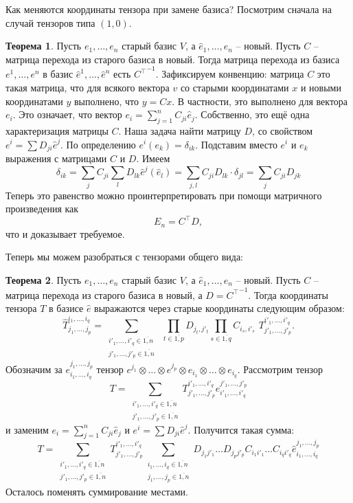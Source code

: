 \documentclass[10pt,a4paper,oneside]{book}
\theoremstyle{definition}
\newtheorem{thm}{{\color{red!40!black} Теорема}}
\newcommand{\ovl}{\overline}
\def\thrm{\begin{thm}}
\def\ethrm{\end{thm}}
\begin{document}
Как меняются координаты тензора при замене базиса? Посмотрим сначала на случай тензоров типа $(1,0)$.

\thrm Пусть $e_1,\dots,e_n$ старый базис $V$, а $\hat{e}_1,\dots,\hat{e}_n$ -- новый. Пусть $C$ -- матрица перехода из старого базиса в новый. Тогда матрица перехода из базиса $e^1,\dots,e^n$ в базис $\hat{e}^1,\dots,\hat{e}^n$ есть ${C^{\top}}^{-1}$.
\proof Зафиксируем конвенцию: матрица $C$ это такая матрица, что для всякого вектора $v$ со старыми координатами $x$ и новыми координатами $y$ выполнено, что $y=Cx$. В частности, это выполнено для вектора $e_i$. Это означает, что вектор $e_i=\sum_{j=1}^nC_{ji}\hat{e}_j$. Собственно, это ещё одна характеризация матрицы $C$. Наша задача найти матрицу $D$, со свойством $e^i=\sum D_{ji}\hat{e}^j$. По определению $e^i(e_k)=\delta_{ik}$. Подставим вместо $e^i$ и $e_k$ выражения с матрицами $C$ и $D$. Имеем
$$\delta_{ik}=\sum_{j}C_{ji} \sum_{l}D_{lk}\hat{e}^j(\hat{e}_l)=\sum_{j,l}C_{ji}D_{lk}\cdot\delta_{jl}=\sum_{j}C_{ji}D_{jk}$$
Теперь это равенство можно проинтерпретировать при помощи матричного произведения как 
$$E_n=C^{\top}D,$$
что и доказывает требуемое.
\endproof
\ethrm

Теперь мы можем разобраться с тензорами общего вида:

\thrm Пусть $e_1,\dots,e_n$ старый базис $V$, а $\hat{e}_1,\dots,\hat{e}_n$ -- новый. Пусть $C$ -- матрица перехода из старого базиса в новый, а $D={C^{\top}}^{-1}$. Тогда координаты тензора $T$ в базисе $\hat{e}$ выражаются через старые координаты следующим образом:
$$\hat{T}_{j_1,\dots,j_p}^{i_1,\dots,i_q}=\sum_{\substack{i'_1,\dots,i'_q \in \ovl{1,n}\\ j'_1,\dots,j'_p \in \ovl{1,n}}} \,\,
\prod_{t\in \ovl{1,p}} D_{j_t,j'_t} \prod_{s\in \ovl{1,q}} C_{i_s,i'_s}  \,\,T_{j'_1,\dots,j'_p}^{i'_1,\dots,i'_q}.$$
\proof Обозначим за $e^{j_1,\dots,j_p}_{i_1,\dots,i_q}$ тензор $e^{j_1}\otimes \dots \otimes e^{j_p} \otimes e_{i_1}\otimes \dots \otimes e_{i_q}$. Рассмотрим тензор
$$ T= \sum_{\substack{i'_1,\dots,i'_q \in \ovl{1,n}\\ j'_1,\dots,j'_p \in \ovl{1,n}}} T_{j'_1,\dots,j'_p}^{i'_1,\dots,i'_q} e^{j'_1,\dots,j'_p}_{i'_1,\dots,i'_q}$$ 
и заменим $e_i=\sum_{j=1}^nC_{ji}\hat{e}_j$ и $e^i=\sum D_{ji}\hat{e}^j$. Получится такая сумма:
$$ T= \sum_{\substack{i'_1,\dots,i'_q \in \ovl{1,n}\\ j'_1,\dots,j'_p \in \ovl{1,n}}} T_{j'_1,\dots,j'_p}^{i'_1,\dots,i'_q} \sum_{\substack{i_1,\dots,i_q \in \ovl{1,n}\\ j_1,\dots,j_p \in \ovl{1,n}} } D_{j_1j'_1}\dots D_{j_pj'_p} C_{i_1i'_1}\dots C_{i_qi'_q} \hat{e}^{j_1,\dots,j_p}_{i_1,\dots,i_q}$$
Осталось поменять суммирование местами.
\endproof
\ethrm
\end{document}
